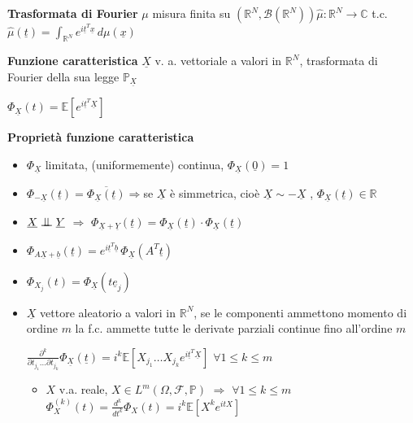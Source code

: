 \documentclass[openany]{book} %
\newcommand{\ind}{\mathrel{\text{\scalebox{1.07}{$\perp\mkern-10mu\perp$}}}}
\begin{document}
\textbf{Trasformata di Fourier} $\mu$ misura finita su $(\mathbb{R}^N, \mathcal{B}(\mathbb{R}^N))$\quad $\hat {\mu}:\mathbb{R}^N\rightarrow \mathbb{C}$ t.c. $\hat {\mu}(\underline{t})=\int_{\mathbb{R}^N}e^{i \underline{t}^T \underline{x}}\,d\mu(\underline{x})$

\textbf{Funzione caratteristica} $\underline{X}$ v. a. vettoriale a valori in $\mathbb{R}^N$, trasformata di Fourier della sua legge $\mathbb{P}_{\underline{X}}$

$\Phi_{\underline{X}}(t)=\mathbb{E}\left[e^{i \underline{t}^T \underline{X}}\right]$

\textbf{Proprietà funzione caratteristica}

\begin{itemize}

\item $\Phi_{\underline{X}}$ limitata, (uniformemente) continua, $\Phi_{\underline{X}}(\underline{0})=1$

\item $\Phi_{-\underline{X}}(\underline{t}) = \overline{\Phi_{\underline{X}}(\underline{t})}$\quad$ \Rightarrow$\quad se $\underline{X}$ è simmetrica, cioè $\underline{X}\sim-\underline{X}$ , \quad $\Phi_{\underline{X}}(\underline{t})\in \mathbb{R}$

\item $\underline{X}\ind \underline{Y}$ \quad $\Rightarrow$ \quad $\Phi_{\underline{X}+\underline{Y}}(\underline{t})=\Phi_{\underline{X}}(\underline{t})\cdot\Phi_{\underline{X}}(\underline{t})$

\item $\Phi_{A\underline{X}+\underline{b}}(\underline{t})= e^{i \underline{t}^T \underline{b}}\,\Phi_{\underline{X}}(A^T\underline{t})$

\item $\Phi_{X_j}(t) = \Phi_{\underline{X}}(t\underline{e}_j)$

\item $\underline{X}$ vettore aleatorio a valori in $\mathbb{R}^N$, se le componenti ammettono momento di ordine $m$ la f.c. ammette tutte le derivate parziali continue fino all'ordine $m$

$\frac{\partial^k}{\partial t_{j_1}\dots\partial t_{j_k}}\Phi_{\underline{X}}(\underline{t}) =i^k \mathbb{E}\left[X_{j_1}\dots X_{j_k}e^{i \underline{t}^T \underline{X}}\right]$ \quad $\forall 1\leq k\leq m$

\begin{itemize}

\item $X$ v.a. reale, $X\in L^m(\Omega,\mathcal{F},\mathbb{P})$ \quad $\Rightarrow$ \quad $ \forall 1\leq k \leq m$ \quad $\Phi_X^{(k)}(t)=\frac{d^k}{dt^k}\Phi_X(t)=i^k \mathbb{E}\left[X^ke^{itX}\right]$ 


\end{itemize}
\end{itemize}
\end{document}
